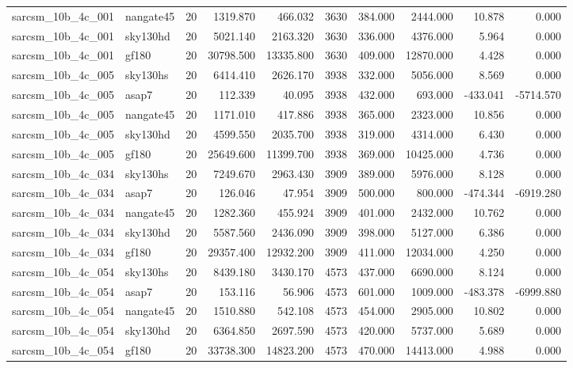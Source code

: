 \begin{longtable}{llrrrrrrrr}
sarcsm\_10b\_4c\_001 & nangate45 & 20 & 1319.870 & 466.032 & 3630 & 384.000 & 2444.000 & 10.878 & 0.000 \\
sarcsm\_10b\_4c\_001 & sky130hd & 20 & 5021.140 & 2163.320 & 3630 & 336.000 & 4376.000 & 5.964 & 0.000 \\
sarcsm\_10b\_4c\_001 & gf180 & 20 & 30798.500 & 13335.800 & 3630 & 409.000 & 12870.000 & 4.428 & 0.000 \\
sarcsm\_10b\_4c\_005 & sky130hs & 20 & 6414.410 & 2626.170 & 3938 & 332.000 & 5056.000 & 8.569 & 0.000 \\
sarcsm\_10b\_4c\_005 & asap7 & 20 & 112.339 & 40.095 & 3938 & 432.000 & 693.000 & -433.041 & -5714.570 \\
sarcsm\_10b\_4c\_005 & nangate45 & 20 & 1171.010 & 417.886 & 3938 & 365.000 & 2323.000 & 10.856 & 0.000 \\
sarcsm\_10b\_4c\_005 & sky130hd & 20 & 4599.550 & 2035.700 & 3938 & 319.000 & 4314.000 & 6.430 & 0.000 \\
sarcsm\_10b\_4c\_005 & gf180 & 20 & 25649.600 & 11399.700 & 3938 & 369.000 & 10425.000 & 4.736 & 0.000 \\
sarcsm\_10b\_4c\_034 & sky130hs & 20 & 7249.670 & 2963.430 & 3909 & 389.000 & 5976.000 & 8.128 & 0.000 \\
sarcsm\_10b\_4c\_034 & asap7 & 20 & 126.046 & 47.954 & 3909 & 500.000 & 800.000 & -474.344 & -6919.280 \\
sarcsm\_10b\_4c\_034 & nangate45 & 20 & 1282.360 & 455.924 & 3909 & 401.000 & 2432.000 & 10.762 & 0.000 \\
sarcsm\_10b\_4c\_034 & sky130hd & 20 & 5587.560 & 2436.090 & 3909 & 398.000 & 5127.000 & 6.386 & 0.000 \\
sarcsm\_10b\_4c\_034 & gf180 & 20 & 29357.400 & 12932.200 & 3909 & 411.000 & 12034.000 & 4.250 & 0.000 \\
sarcsm\_10b\_4c\_054 & sky130hs & 20 & 8439.180 & 3430.170 & 4573 & 437.000 & 6690.000 & 8.124 & 0.000 \\
sarcsm\_10b\_4c\_054 & asap7 & 20 & 153.116 & 56.906 & 4573 & 601.000 & 1009.000 & -483.378 & -6999.880 \\
sarcsm\_10b\_4c\_054 & nangate45 & 20 & 1510.880 & 542.108 & 4573 & 454.000 & 2905.000 & 10.802 & 0.000 \\
sarcsm\_10b\_4c\_054 & sky130hd & 20 & 6364.850 & 2697.590 & 4573 & 420.000 & 5737.000 & 5.689 & 0.000 \\
sarcsm\_10b\_4c\_054 & gf180 & 20 & 33738.300 & 14823.200 & 4573 & 470.000 & 14413.000 & 4.988 & 0.000 \\

\end{longtable}
